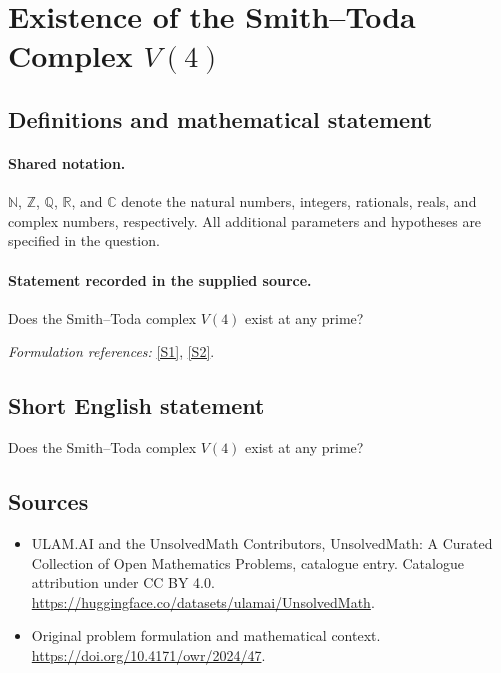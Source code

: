 \documentclass[11pt]{article}
\newcommand{\sref}[2]{\hyperlink{source:#1:#2}{[S#2]}}
\begin{document}
\section{\texorpdfstring{Existence of the Smith–Toda Complex $V(4)$}{Existence of the Smith–Toda Complex V(4)}}\label{statement}

\subsection{Definitions and mathematical statement}

\paragraph{Shared notation.}$\mathbb N$, $\mathbb Z$, $\mathbb Q$, $\mathbb R$, and $\mathbb C$ denote the natural numbers, integers, rationals, reals, and complex numbers, respectively. All additional parameters and hypotheses are specified in the question.


\paragraph{Statement recorded in the supplied source.}
Does the Smith–Toda complex $V(4)$ exist at any prime?
\par\smallskip\textit{Formulation references:} \sref{statement}{1}, \sref{statement}{2}.
\subsection{Short English statement}
Does the Smith–Toda complex $V(4)$ exist at any prime?
\subsection{Sources}
\begin{itemize}
\item[\hypertarget{source:statement:1}{S1}] ULAM.AI and the UnsolvedMath Contributors, UnsolvedMath: A Curated Collection of Open Mathematics Problems, catalogue entry. Catalogue attribution under CC BY 4.0.
\url{https://huggingface.co/datasets/ulamai/UnsolvedMath}.
\item[\hypertarget{source:statement:2}{S2}] Original problem formulation and mathematical context.
\url{https://doi.org/10.4171/owr/2024/47}.
\end{itemize}
\label{end:statement}
\end{document}
